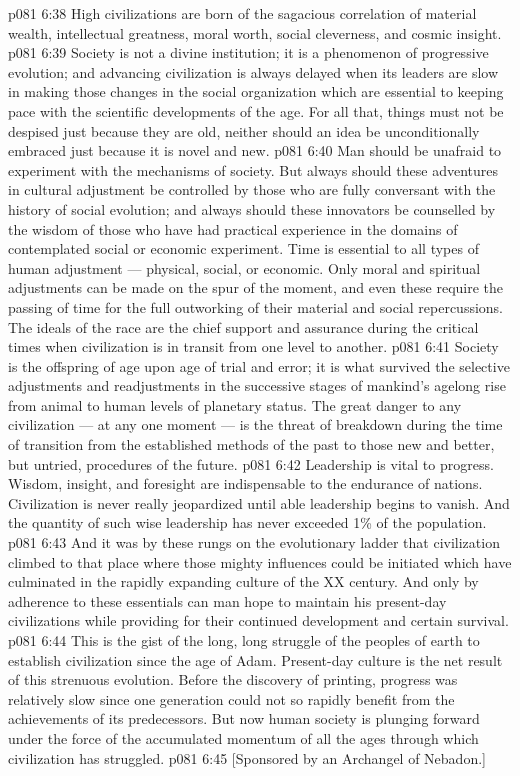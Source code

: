 \vs p081 6:38 High civilizations are born of the sagacious correlation of material wealth, intellectual greatness, moral worth, social cleverness, and cosmic insight.
\vs p081 6:39 \bibnobreakspace {} Society is not a divine institution; it is a phenomenon of progressive evolution; and advancing civilization is always delayed when its leaders are slow in making those changes in the social organization which are essential to keeping pace with the scientific developments of the age. For all that, things must not be despised just because they are old, neither should an idea be unconditionally embraced just because it is novel and new.
\vs p081 6:40 Man should be unafraid to experiment with the mechanisms of society. But always should these adventures in cultural adjustment be controlled by those who are fully conversant with the history of social evolution; and always should these innovators be counselled by the wisdom of those who have had practical experience in the domains of contemplated social or economic experiment.  Time is essential to all types of human adjustment --- physical, social, or economic. Only moral and spiritual adjustments can be made on the spur of the moment, and even these require the passing of time for the full outworking of their material and social repercussions. The ideals of the race are the chief support and assurance during the critical times when civilization is in transit from one level to another.
\vs p081 6:41 \bibnobreakspace {} Society is the offspring of age upon age of trial and error; it is what survived the selective adjustments and readjustments in the successive stages of mankind’s agelong rise from animal to human levels of planetary status. The great danger to any civilization --- at any one moment --- is the threat of breakdown during the time of transition from the established methods of the past to those new and better, but untried, procedures of the future.
\vs p081 6:42 Leadership is vital to progress. Wisdom, insight, and foresight are indispensable to the endurance of nations. Civilization is never really jeopardized until able leadership begins to vanish. And the quantity of such wise leadership has never exceeded 1\% of the population.
\vs p081 6:43 And it was by these rungs on the evolutionary ladder that civilization climbed to that place where those mighty influences could be initiated which have culminated in the rapidly expanding culture of the XX century. And only by adherence to these essentials can man hope to maintain his present\hyp{}day civilizations while providing for their continued development and certain survival.
\vs p081 6:44 \pc This is the gist of the long, long struggle of the peoples of earth to establish civilization since the age of Adam. Present\hyp{}day culture is the net result of this strenuous evolution. Before the discovery of printing, progress was relatively slow since one generation could not so rapidly benefit from the achievements of its predecessors. But now human society is plunging forward under the force of the accumulated momentum of all the ages through which civilization has struggled.
\vsetoff
\vs p081 6:45 [Sponsored by an Archangel of Nebadon.]
\quizlink
